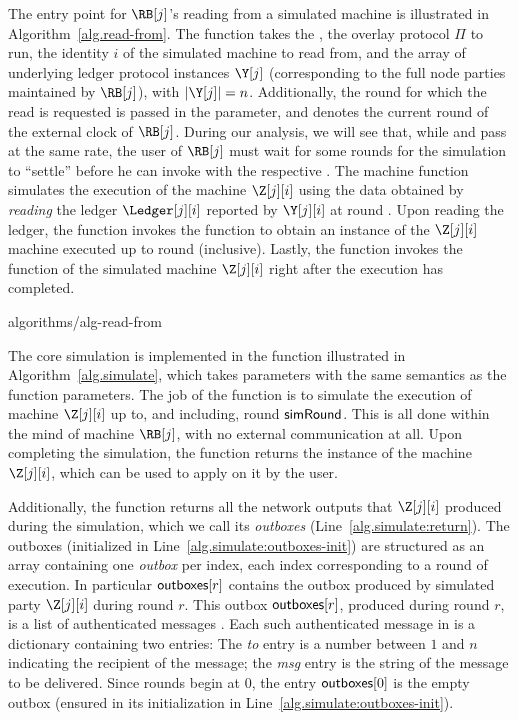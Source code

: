 The entry point for $\RB[j]$'s reading from a simulated machine
is illustrated in Algorithm~\ref{alg.read-from}.
The \readFromMachine function takes the \sid, the overlay protocol $\Pi$ to run,
the identity $i$ of the simulated machine to read from,
and the array of underlying ledger protocol instances $\Y[j]$
(corresponding to the full node parties maintained by $\RB[j]$),
with $|\Y[j]| = n$. Additionally, the round for which the read is requested
is passed in the \simulationRound parameter, and \realityRound denotes the
current round of the external clock of $\RB[j]$. During our analysis, we will
see that, while \simulationRound and \realityRound pass at the same rate,
the user of $\RB[j]$ must wait for some \realityRound rounds for the simulation
to ``settle'' before he can invoke \readFromMachine with the respective \simulationRound.
The \readFromMachine machine function simulates the execution of the machine
$\Z[j][i]$ using the data obtained by \emph{reading} the ledger $\Ledger[j][i]$
reported by $\Y[j][i]$ at round \realityRound. Upon reading the ledger,
the \readFromMachine function invokes the \simulate function to obtain an instance
of the $\Z[j][i]$ machine executed up to round \simulationRound (inclusive).
Lastly, the \readFromMachine function invokes the \lread function of the simulated
machine $\Z[j][i]$ right after the \simulationRound execution has completed.

{algorithms/alg-read-from}

The core simulation is implemented in the function \simulate illustrated in
Algorithm~\ref{alg.simulate}, which takes parameters with the same semantics as
the \readFromMachine function parameters. The job of the \simulate function
is to simulate the execution of machine $\Z[j][i]$ up to, and including, round
$\textsf{simRound}$. This is all done within the mind of machine $\RB[j]$,
with no external communication at all. Upon completing the simulation,
the \simulate function returns the instance of the machine $\Z[j][i]$,
which can be used to apply \lread on it by the user.

Additionally, the
\simulate function returns all the network outputs that $\Z[j][i]$
produced during the simulation, which we call its \emph{outboxes}
(Line~\ref{alg.simulate:return}). The outboxes (initialized in
Line~\ref{alg.simulate:outboxes-init}) are structured as an array
containing one \emph{outbox} per index, each index corresponding to
a round of execution. In particular $\textsf{outboxes}[r]$ contains the
outbox produced by simulated party $\Z[j][i]$ during round $r$.
This outbox $\textsf{outboxes}[r]$, produced during round $r$, is a list
of authenticated messages \netouts. Each such authenticated
message \netout in \netouts is a dictionary containing two entries:
The \emph{to} entry is a number between $1$ and $n$
indicating the recipient of the message; the \emph{msg}
entry is the string of the message to be delivered.
Since rounds begin at $0$, the entry $\textsf{outboxes}[0]$ is the
empty outbox (ensured in its initialization in
Line~\ref{alg.simulate:outboxes-init}).

